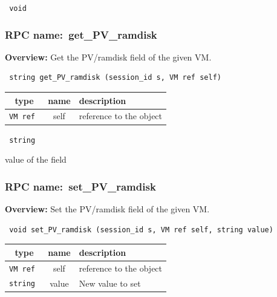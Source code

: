 \vspace{0.3cm}

{\tt 
void
}



\vspace{0.3cm}
\vspace{0.3cm}
\vspace{0.3cm}
\subsubsection{RPC name:~get\_PV\_ramdisk}

{\bf Overview:} 
Get the PV/ramdisk field of the given VM.

\begin{verbatim} string get_PV_ramdisk (session_id s, VM ref self)\end{verbatim}



 
\vspace{0.3cm}
\begin{tabular}{|c|c|p{7cm}|}
 \hline
{\bf type} & {\bf name} & {\bf description} \\ \hline
{\tt VM ref } & self & reference to the object \\ \hline 

\end{tabular}

\vspace{0.3cm}

{\tt 
string
}


value of the field
\vspace{0.3cm}
\vspace{0.3cm}
\vspace{0.3cm}
\subsubsection{RPC name:~set\_PV\_ramdisk}

{\bf Overview:} 
Set the PV/ramdisk field of the given VM.

\begin{verbatim} void set_PV_ramdisk (session_id s, VM ref self, string value)\end{verbatim}



 
\vspace{0.3cm}
\begin{tabular}{|c|c|p{7cm}|}
 \hline
{\bf type} & {\bf name} & {\bf description} \\ \hline
{\tt VM ref } & self & reference to the object \\ \hline 

{\tt string } & value & New value to set \\ \hline 

\end{tabular}

